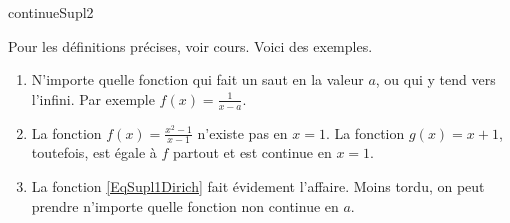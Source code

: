 
\begin{corrige}{continueSupl2}

Pour les définitions précises, voir cours. Voici des exemples.
\begin{enumerate}
\item N'importe quelle fonction qui fait un saut en la valeur $a$, ou qui y tend vers l'infini. Par exemple $f(x)=\frac{ 1 }{ x-a }$.
\item La fonction $f(x)=\frac{ x^2-1 }{ x-1 }$ n'existe pas en $x=1$. La fonction $g(x)=x+1$, toutefois, est égale à $f$ partout et est continue en $x=1$.
\item La fonction \eqref{EqSupl1Dirich} fait évidement l'affaire. Moins tordu, on peut prendre n'importe quelle fonction non continue en $a$.

\end{enumerate}


\end{corrige}
